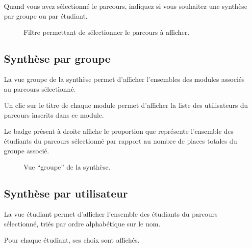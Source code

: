 \documentclass[letterpaper,10pt,french]{sphinxmanual}
\begin{document}
Quand vous avez sélectionné le parcours, indiquez si vous souhaitez une synthèse par groupe ou par étudiant.
\begin{figure}[htbp]
\centering
\capstart

\caption{Filtre permettant de sélectionner le parcours à afficher.}\end{figure}


\subsection{Synthèse par groupe}
\label{prof:synthese-par-groupe}
La vue groupe de la synthèse permet d'afficher l'ensembles des modules associés au parcours sélectionné.

Un clic sur le titre de chaque module permet d'afficher la liste des utilisateurs du parcours inscrits dans ce module.

Le badge présent à droite affiche le proportion que représente l'ensemble des étudiants du parcours sélectionné par rapport au nombre de places totales du groupe associé.
\begin{figure}[htbp]
\centering
\capstart

\caption{Vue ``groupe'' de la synthèse.}\end{figure}


\subsection{Synthèse par utilisateur}
\label{prof:synthese-par-utilisateur}
La vue étudiant permet d'afficher l'ensemble des étudiants du parcours sélectionné, triés par ordre alphabétique
sur le nom.

Pour chaque étudiant, ses choix sont affichés.
\end{document}

